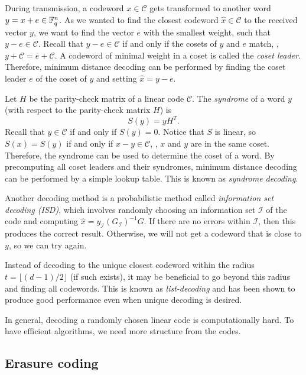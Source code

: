 \documentclass[../main.tex]{subfiles}
\begin{document}
During transmission, a codeword $x \in \mathcal{C}$ gets transformed to another word $y = x + e \in \mathbb{F}_q^n$. As we wanted to find the closest codeword $\hat{x} \in \mathcal{C}$ to the received vector $y$, we want to find the vector $e$ with the smallest weight, such that $y - e \in \mathcal{C}$. Recall that $y - e \in \mathcal{C}$ if and only if the cosets of $y$ and $e$ match, \ie, $y + \mathcal{C} = e + \mathcal{C}$. A codeword of minimal weight in a coset is called the \emph{coset leader}. Therefore, minimum distance decoding can be performed by finding the coset leader $e$ of the coset of $y$ and setting $\hat{x} = y - e$.

Let $H$ be the parity-check matrix of a linear code $\mathcal{C}$. The \emph{syndrome} of a word $y$ (with respect to the parity-check matrix $H$) is
\begin{equation*}
    S(y) = yH^T.
\end{equation*}
Recall that $y \in \mathcal{C}$ if and only if $S(y) = 0$. Notice that $S$ is linear, so $S(x) = S(y)$ if and only if $x - y \in \mathcal{C}$, \ie, $x$ and $y$ are in the same coset. Therefore, the syndrome can be used to determine the coset of a word. By precomputing all coset leaders and their syndromes, minimum distance decoding can be performed by a simple lookup table. This is known as \emph{syndrome decoding}.

Another decoding method is a probabilistic method called \emph{information set decoding (ISD)}, which involves randomly choosing an information set $\mathcal{I}$ of the code and computing $\hat{x} = y_\mathcal{I}(G_\mathcal{I})^{-1} G$. If there are no errors within $\mathcal{I}$, then this produces the correct result. Otherwise, we will not get a codeword that is close to $y$, so we can try again.

Instead of decoding to the unique closest codeword within the radius $t = \lfloor (d - 1) / 2 \rfloor$ (if such exists), it may be beneficial to go beyond this radius and finding all codewords. This is known as \emph{list-decoding} and has been shown to produce good performance even when unique decoding is desired.

In general, decoding a randomly chosen linear code is computationally hard. To have efficient algorithms, we need more structure from the codes.

\subsection{Erasure coding}
\end{document}
